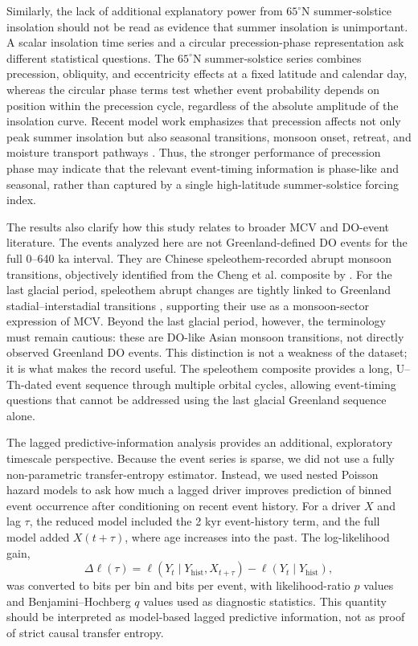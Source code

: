 \documentclass[11pt]{article}
\begin{document}
Similarly, the lack of additional explanatory power from \(65^\circ\)N summer-solstice insolation should not be read as evidence that summer insolation is unimportant. A scalar insolation time series and a circular precession-phase representation ask different statistical questions. The \(65^\circ\)N summer-solstice series combines precession, obliquity, and eccentricity effects at a fixed latitude and calendar day, whereas the circular phase terms test whether event probability depends on position within the precession cycle, regardless of the absolute amplitude of the insolation curve. Recent model work emphasizes that precession affects not only peak summer insolation but also seasonal transitions, monsoon onset, retreat, and moisture transport pathways \citep{wu2023}. Thus, the stronger performance of precession phase may indicate that the relevant event-timing information is phase-like and seasonal, rather than captured by a single high-latitude summer-solstice forcing index.

The results also clarify how this study relates to broader MCV and DO-event literature. The events analyzed here are not Greenland-defined DO events for the full 0--640 ka interval. They are Chinese speleothem-recorded abrupt monsoon transitions, objectively identified from the Cheng et al. composite by \citet{rousseau2023}. For the last glacial period, speleothem abrupt changes are tightly linked to Greenland stadial--interstadial transitions \citep{corrick2020}, supporting their use as a monsoon-sector expression of MCV. Beyond the last glacial period, however, the terminology must remain cautious: these are DO-like Asian monsoon transitions, not directly observed Greenland DO events. This distinction is not a weakness of the dataset; it is what makes the record useful. The speleothem composite provides a long, U--Th-dated event sequence through multiple orbital cycles, allowing event-timing questions that cannot be addressed using the last glacial Greenland sequence alone.

The lagged predictive-information analysis provides an additional, exploratory timescale perspective. Because the event series is sparse, we did not use a fully non-parametric transfer-entropy estimator. Instead, we used nested Poisson hazard models to ask how much a lagged driver improves prediction of binned event occurrence after conditioning on recent event history. For a driver \(X\) and lag \(\tau\), the reduced model included the 2 kyr event-history term, and the full model added \(X(t+\tau)\), where age increases into the past. The log-likelihood gain,
\[
\Delta \ell(\tau)
= \ell(Y_t \mid Y_{\mathrm{hist}}, X_{t+\tau})
- \ell(Y_t \mid Y_{\mathrm{hist}}),
\]
was converted to bits per bin and bits per event, with likelihood-ratio \(p\) values and Benjamini--Hochberg \(q\) values used as diagnostic statistics. This quantity should be interpreted as model-based lagged predictive information, not as proof of strict causal transfer entropy.
\end{document}

